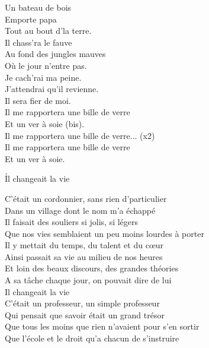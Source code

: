 \documentclass{novel}
\begin{document}
{\begin{minipage}[t][0.5\textheight][t]{\textwidth}
\begin{multicols}{2}
Un bateau de bois \\
Emporte papa \\
Tout au bout d'la terre. \\
Il chass'ra le fauve \\
Au fond des jungles mauves \\
Où le jour n'entre pas. \\
Je cach'rai ma peine. \\
J'attendrai qu'il revienne. \\
Il sera fier de moi. \\
Il me rapportera une bille de verre \\
Et un ver à soie (bis). \\

Il me rapportera une bille de verre... (x2) \\
Il me rapportera une bille de verre \\
Et un ver à soie. \\

\end{multicols}
\end{minipage}
\vspace{0.04\textheight}

\begin{minipage}[b][0.52\textheight][t]{\textwidth}
\h*{Il changeait la vie}
\begin{multicols}{2}
\small
C'était un cordonnier, sans rien d'particulier \\
Dans un village dont le nom m'a échappé \\
Il faisait des souliers si jolis, si légers \\
Que nos vies semblaient un peu moins lourdes à porter \footnotesize \\

\small
Il y mettait du temps, du talent et du cœur \\
Ainsi passait sa vie au milieu de nos heures \\
Et loin des beaux discours, des grandes théories \\
A sa tâche chaque jour, on pouvait dire de lui \\
Il changeait la vie \footnotesize \\

\small
C'était un professeur, un simple professeur \\
Qui pensait que savoir était un grand trésor \\
Que tous les moins que rien n'avaient pour s'en sortir \\
Que l'école et le droit qu'a chacun de s'instruire \footnotesize \\


\end{multicols}
\end{minipage}}
\end{document}
